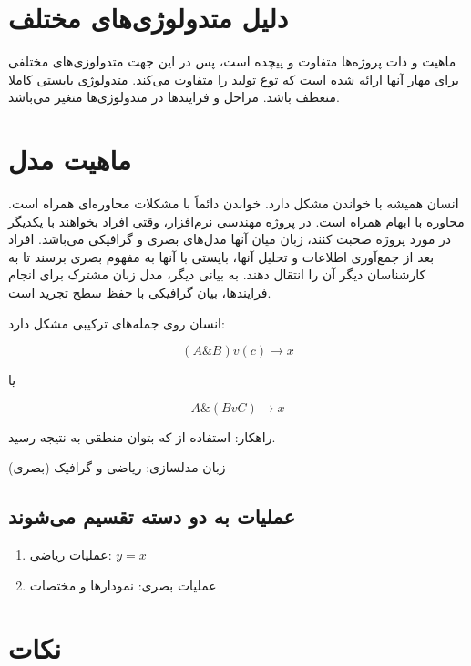 \section{دلیل متدولوژی‌های مختلف}

ماهیت و ذات پروژه‌ها متفاوت و پیچده‌ است، پس در این جهت متدولوزی‌های مختلفی برای
مهار آنها ارائه شده است که توع تولید را متفاوت می‌کند. متدولوژی بایستی کاملا
منعطف باشد. مراحل و فرایند‌ها در متدولوژی‌ها متغیر می‌باشد.

\section{ماهیت مدل}

انسان همیشه با خواندن مشکل دارد. خواندن دائماً با مشکلات محاوره‌ای همراه است.
محاوره با ابهام همراه است. در پروژه مهندسی نرم‌افزار، وقتی افراد بخواهند با
یکدیگر در مورد پروژه صحبت کنند، زبان میان آنها مدل‌های بصری و گرافیکی می‌باشد.
افراد بعد از جمع‌آوری اطلاعات و تحلیل آنها، بایستی با آنها به مفهوم بصری برسند
تا به کارشناسان دیگر آن را انتقال دهند. به بیانی دیگر، مدل زبان مشترک برای انجام
فرایند‌ها، بیان گرافیکی با حفظ سطح تجرید است.

انسان روی جمله‌های ترکیبی مشکل دارد: 

\begin{equation}
  \label{eq:مقایسه عملگر‌ها}
  (A \& B) v (c) \rightarrow x
\end{equation}

یا

\begin{equation}
  \label{eq:مقایسه عملگر‌ها}
  A \& (B v C) \rightarrow x
\end{equation}

راهکار: استفاده از  که بتوان منطقی به نتیجه رسید.

زبان مدلسازی: ریاضی و گرافیک (بصری)

\subsection*{عملیات به دو دسته تقسیم می‌شوند}

\begin{enumerate}
  \item عملیات ریاضی: $y = x$
  \item عملیات بصری: نمودار‌ها و مختصات
\end{enumerate}

\section*{نکات}

